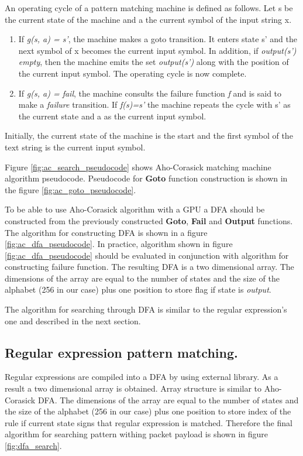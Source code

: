 \documentclass[thesis=M,english]{FITthesis}[2011/07/15]
\begin{document}
An operating cycle of a pattern matching machine is defined as follows. Let s be the current state of the machine and a the current symbol of the input string x.
\begin{enumerate}
\item If \emph{g(s, a) = s'}, the machine makes a goto transition. It enters state s' and the next symbol of x becomes the current input symbol.
In addition, if  \emph{output(s')  empty}, then the machine emits the set \emph{output(s')} along with the position of the current input symbol. The operating cycle is now complete.
\item If \emph{g(s, a) = fail}, the machine consults the failure function \emph{f} and is said to make a \emph{failure} transition. If \emph{f(s)=s'} the machine repeats the cycle with s' as the current state and a as the current input symbol.
\end{enumerate}
Initially, the current state of the machine is the start and the first symbol of the text string is the current input symbol. 

Figure \ref{fig:ac_search_pseudocode} shows Aho-Corasick matching machine algorithm pseudocode. Pseudocode for \textbf{Goto} function construction is shown in the figure \ref{fig:ac_goto_pseudocode}.

To be able to use Aho-Corasick algorithm with a GPU a DFA should be constructed from the previously constructed \textbf{Goto}, \textbf{Fail} and \textbf{Output} functions. The algorithm for constructing DFA is shown in a figure \ref{fig:ac_dfa_pseudocode}. In practice, algorithm shown in figure \ref{fig:ac_dfa_pseudocode} should be evaluated in conjunction with algorithm for constructing failure function. The resulting DFA is a two dimensional array. The dimensions of the array are equal to the number of states and the size of the alphabet (256 in our case) plus one position to store flag if state is \emph{output}.

The algorithm for searching through DFA is similar to the regular expression's one and described in the next section.

\subsection*{Regular expression pattern matching.}
Regular expressions are compiled into a DFA by using external library. As a result a two dimensional array is obtained. Array structure is similar to Aho-Corasick DFA. The dimensions of the array are equal to the number of states and the size of the alphabet (256 in our case) plus one position to store index of the rule if current state signs that regular expression is matched. Therefore the final algorithm for searching pattern withing packet payload is shown in figure \ref{fig:dfa_search}.
\end{document}
